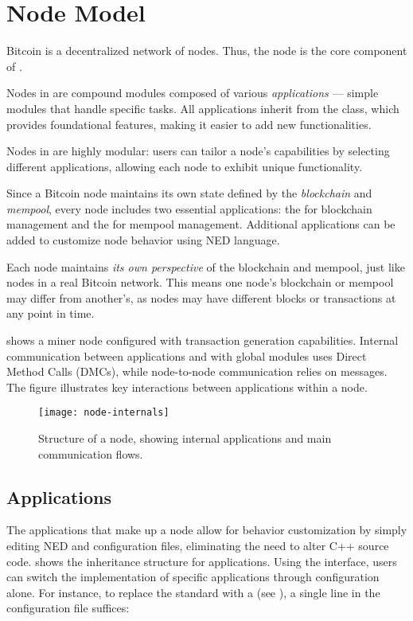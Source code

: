 \section{Node Model}\label{sec:impl-node}

Bitcoin is a decentralized network of nodes. Thus, the node is the core
component of \iblock{}.

Nodes in \iblock{} are compound modules composed of various \emph{applications}
--- simple modules that handle specific tasks. All applications inherit from
the  class, which provides foundational features, making it
easier to add new functionalities.

Nodes in \iblock{} are highly modular: users can tailor a node's capabilities
by selecting different applications, allowing each node to exhibit unique
functionality.

Since a Bitcoin node maintains its own state defined by the \emph{blockchain}
and \emph{mempool}, every \iblock{} node includes two essential applications:
the  for blockchain management and the
 for mempool management. Additional applications can be
added to customize node behavior using NED language.

Each \iblock{} node maintains \emph{its own perspective} of the blockchain and mempool,
just like nodes in a real Bitcoin network. This means one node's blockchain or
mempool may differ from another's, as nodes may have different blocks or
transactions at any point in time.

 shows a miner node configured with transaction
generation capabilities. Internal communication between applications and with
global modules uses Direct Method Calls (DMCs), while node-to-node
communication relies on messages. The figure illustrates key interactions
between applications within a node.

\begin{figure}[tbhp]
	\centering
	\texttt{[image: node-internals]}
	\caption{Structure of a node, showing internal applications and main
	communication flows.}\label{fig:node-internals}
\end{figure}

\subsection{Applications}\label{subsec:applications}

The applications that make up a node allow for behavior customization by simply
editing NED and configuration files, eliminating the need to alter C++ source
code.  shows the inheritance structure for
applications. Using the  interface, users can switch the
implementation of specific applications through configuration alone. For
instance, to replace the standard  with a
 (see ), a single line in the
configuration file suffices:

